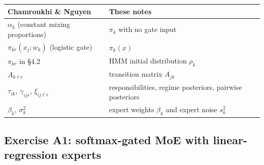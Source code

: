 \begin{center}
\renewcommand{\arraystretch}{1.2}
\begin{tabular}{@{}ll@{}}
\toprule
Chamroukhi \& Nguyen & These notes \\
\midrule
$\alpha_k$ (constant mixing proportions) & $\pi_k$ with no gate input \\
$\pi_{kr}(x_j;w_k)$ (logistic gate) & $\pi_k(x)$ \\
$\pi_{kr}$ in \S4.2 & HMM initial distribution $\rho_k$ \\
$A_{k\ell r}$ & transition matrix $A_{jk}$ \\
$\tau_{ik}$, $\gamma_{ijr}$, $\xi_{ij\ell r}$ & responsibilities, regime posteriors, pairwise posteriors \\
$\beta_k$, $\sigma_k^2$ & expert weights $\beta_k$ and expert noise $s_k^2$ \\
\bottomrule
\end{tabular}
\end{center}

\subsection{Exercise A1: softmax-gated MoE with linear-regression experts}

